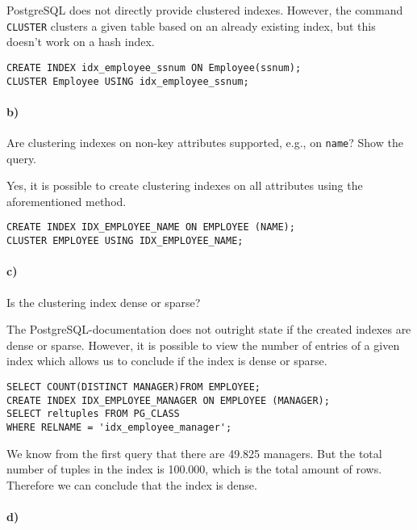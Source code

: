 \documentclass[11pt]{scrartcl}
\begin{document}
PostgreSQL does not directly provide clustered indexes. However, the command \texttt{CLUSTER} clusters a given table based on an already existing index, but this doesn't work on a hash index.

\begin{lstlisting}[style=dbtsql]
CREATE INDEX idx_employee_ssnum ON Employee(ssnum);
CLUSTER Employee USING idx_employee_ssnum;
\end{lstlisting}

\paragraph{b)}

Are clustering indexes on non-key attributes supported, e.g., on \texttt{name}? Show the query.

Yes, it is possible to create clustering indexes on all attributes using the aforementioned method.

\begin{lstlisting}[style=dbtsql]
CREATE INDEX IDX_EMPLOYEE_NAME ON EMPLOYEE (NAME);
CLUSTER EMPLOYEE USING IDX_EMPLOYEE_NAME;
\end{lstlisting}

\paragraph{c)}

Is the clustering index dense or sparse?

The PostgreSQL-documentation does not outright state if the created indexes are dense or sparse. However, it is possible to view the number of entries of a given index which allows us to conclude if the index is dense or sparse. 

\begin{lstlisting}[style=dbtsql]
SELECT COUNT(DISTINCT MANAGER)FROM EMPLOYEE;
CREATE INDEX IDX_EMPLOYEE_MANAGER ON EMPLOYEE (MANAGER);
SELECT reltuples FROM PG_CLASS
WHERE RELNAME = 'idx_employee_manager';
\end{lstlisting}

We know from the first query that there are 49.825 managers. But the total number of tuples in the index is 100.000, which is the total amount of rows. Therefore we can conclude that the index is dense.

\paragraph{d)}
\end{document}
